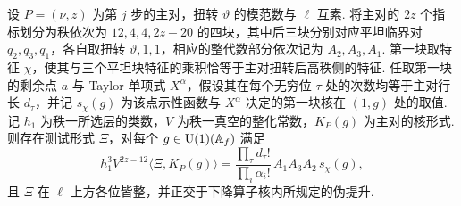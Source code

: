 \begin{lemma}
\label{lem:c-test-seesaw-factorization}
\emitthmsource
设 $P=(\nu,z)$ 为第 $j$ 步的主对，扭转 $\vartheta$ 的模范数与 $\ell$ 互素. 将主对的 $2z$ 个指标划分为秩依次为 $12,4,4,2z-20$ 的四块，其中后三块分别对应平坦临界对 $q_2,q_3,q_1$，各自取扭转 $\vartheta,1,1$，相应的整代数部分依次记为 $A_2,A_3,A_1$. 第一块取特征 $\chi$，使其与三个平坦块特征的乘积恰等于主对扭转后高秩侧的特征. 任取第一块的剩余点 $a$ 与 Taylor 单项式 $X^\alpha$，假设其在每个无穷位 $\tau$ 处的次数均等于主对行长 $d_\tau$，并记 $s_\chi(g)$ 为该点示性函数与 $X^\alpha$ 决定的第一块核在 $(1,g)$ 处的取值. 记 $h_1$ 为秩一所选层的类数，$V$ 为秩一真空的整化常数，$K_P(g)$ 为主对的核形式. 则存在测试形式 $\Xi$，对每个 $g\in \operatorname{U}(1)(\mathbb A_f)$ 满足
\[
 h_1^3 V^{2z-12}\langle\Xi,K_P(g)\rangle
  =\frac{\prod_\tau d_\tau!}{\prod_i\alpha_i!}\, A_1 A_3 A_2\,s_\chi(g),
\]
且 $\Xi$ 在 $\ell$ 上方各位皆整，并正交于下降算子核内所规定的伪提升.
\end{lemma}
